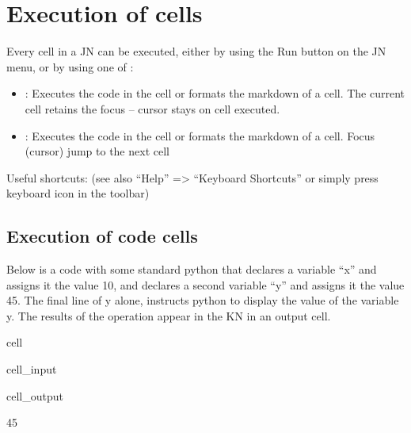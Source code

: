 \documentclass[letterpaper,10pt,english]{jupyterBook}
\begin{document}
\section{Execution of cells}
\label{\detokenize{content/04_PythonEssentials/Intro_Jupyter_notebook:execution-of-cells}}
\sphinxAtStartPar
Every cell in a JN can be executed, either by using the Run button on the JN menu, or by using one of :
\begin{itemize}
\item {} 
\sphinxAtStartPar
{}: Executes the code in the cell or formats the markdown of a cell.  The current cell retains the focus – cursor stays on cell executed.

\item {} 
\sphinxAtStartPar
{}: Executes the code in the cell or formats the markdown of a cell. Focus (cursor) jump to the next cell

\end{itemize}

\sphinxAtStartPar
Useful shortcuts: (see also “Help” => “Keyboard Shortcuts” or simply press keyboard icon in the toolbar)


\subsection{Execution of code cells}
\label{\detokenize{content/04_PythonEssentials/Intro_Jupyter_notebook:execution-of-code-cells}}
\sphinxAtStartPar
Below is a code with some standard python that declares a variable “x” and assigns it the value 10, and declares a second variable “y” and assigns it the value 45.  The final line of y alone, instructs python to display the value of the variable y.  The results of the operation appear in the KN in an output cell.

\begin{sphinxuseclass}{cell}\begin{sphinxVerbatimInput}

\begin{sphinxuseclass}{cell_input}
\begin{sphinxVerbatim}[commandchars=\\\{\}]
  
  
\end{sphinxVerbatim}

\end{sphinxuseclass}\end{sphinxVerbatimInput}
\begin{sphinxVerbatimOutput}

\begin{sphinxuseclass}{cell_output}
\begin{sphinxVerbatim}[commandchars=\\\{\}]
45
\end{sphinxVerbatim}

\end{sphinxuseclass}\end{sphinxVerbatimOutput}

\end{sphinxuseclass}
\end{document}
